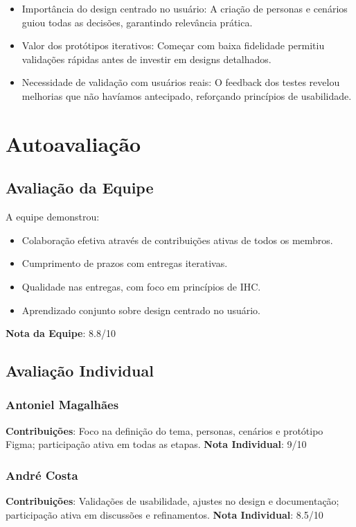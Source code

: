 \documentclass[12pt, a4paper]{report}
\begin{document}
\begin{itemize}
    \item Importância do design centrado no usuário: A criação de personas e cenários guiou todas as decisões, garantindo relevância prática.
    \item Valor dos protótipos iterativos: Começar com baixa fidelidade permitiu validações rápidas antes de investir em designs detalhados.
    \item Necessidade de validação com usuários reais: O feedback dos testes revelou melhorias que não havíamos antecipado, reforçando princípios de usabilidade.
\end{itemize}

\section{Autoavaliação}

\subsection{Avaliação da Equipe}

A equipe demonstrou:
\begin{itemize}
    \item Colaboração efetiva através de contribuições ativas de todos os membros.
    \item Cumprimento de prazos com entregas iterativas.
    \item Qualidade nas entregas, com foco em princípios de IHC.
    \item Aprendizado conjunto sobre design centrado no usuário.
\end{itemize}

\textbf{Nota da Equipe}: 8.8/10

\subsection{Avaliação Individual}

\subsubsection{Antoniel Magalhães}
\textbf{Contribuições}: Foco na definição do tema, personas, cenários e protótipo Figma; participação ativa em todas as etapas.
\textbf{Nota Individual}: 9/10

\subsubsection{André Costa}
\textbf{Contribuições}: Validações de usabilidade, ajustes no design e documentação; participação ativa em discussões e refinamentos.
\textbf{Nota Individual}: 8.5/10
\end{document}
